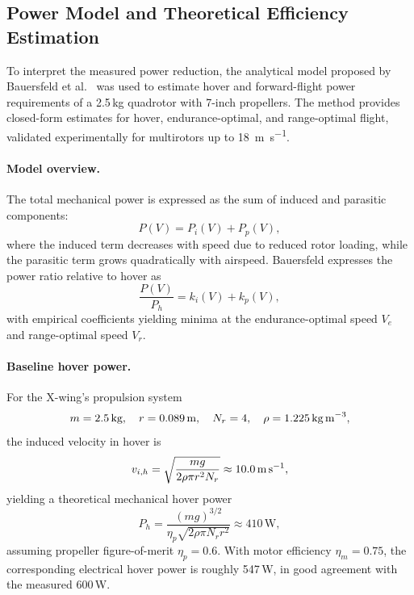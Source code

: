 \subsection{Power Model and Theoretical Efficiency Estimation}\label{sec:power-model}

To interpret the measured power reduction, the analytical model proposed by Bauersfeld et al.~\cite{bauersfeld2021range} was used to estimate hover and forward-flight power requirements of a 2.5\,kg quadrotor with 7-inch propellers.
The method provides closed-form estimates for hover, endurance-optimal, and range-optimal flight, validated experimentally for multirotors up to \SI{18}{\meter\per\second}.

\paragraph{Model overview.}
The total mechanical power is expressed as the sum of induced and parasitic components:
\begin{equation}
P(V) = P_i(V) + P_p(V),
\end{equation}
where the induced term decreases with speed due to reduced rotor loading, while the parasitic term grows quadratically with airspeed.
Bauersfeld expresses the power ratio relative to hover as
\begin{equation}
\frac{P(V)}{P_h} = k_i(V) + k_p(V),
\end{equation}
with empirical coefficients yielding minima at the endurance-optimal speed $V_e$ and range-optimal speed $V_r$.

\paragraph{Baseline hover power.}
For the X-wing's propulsion system
\begin{equation}
m = 2.5\,\text{kg}, \quad r = 0.089\,\text{m}, \quad N_r = 4, \quad \rho = 1.225\,\text{kg\,m}^{-3},
\end{equation}
the induced velocity in hover is
\begin{equation}
v_{i,h} = \sqrt{\frac{mg}{2\rho\pi r^2 N_r}} \approx 10.0\,\text{m\,s}^{-1},
\end{equation}
yielding a theoretical mechanical hover power
\begin{equation}
P_h = \frac{(mg)^{3/2}}{\eta_p\sqrt{2\rho\pi N_r r^2}} \approx 410\,\text{W},
\end{equation}
assuming propeller figure-of-merit $\eta_p = 0.6$.
With motor efficiency $\eta_m = 0.75$, the corresponding electrical hover power is roughly 547\,W, in good agreement with the measured 600\,W.

